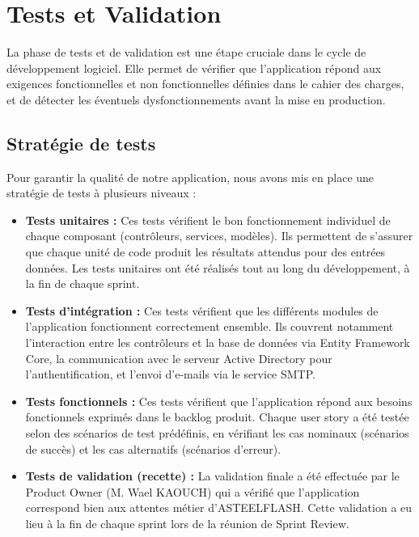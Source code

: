 \section{Tests et Validation}

La phase de tests et de validation est une étape cruciale dans le cycle de développement logiciel. Elle permet de vérifier que l'application répond aux exigences fonctionnelles et non fonctionnelles définies dans le cahier des charges, et de détecter les éventuels dysfonctionnements avant la mise en production.

\subsection{Stratégie de tests}

Pour garantir la qualité de notre application, nous avons mis en place une stratégie de tests à plusieurs niveaux :

\begin{itemize}[label=\textbullet,font=\normalsize]
    \item \textbf{Tests unitaires :} Ces tests vérifient le bon fonctionnement individuel de chaque composant (contrôleurs, services, modèles). Ils permettent de s'assurer que chaque unité de code produit les résultats attendus pour des entrées données. Les tests unitaires ont été réalisés tout au long du développement, à la fin de chaque sprint.
    
    \item \textbf{Tests d'intégration :} Ces tests vérifient que les différents modules de l'application fonctionnent correctement ensemble. Ils couvrent notamment l'interaction entre les contrôleurs et la base de données via Entity Framework Core, la communication avec le serveur Active Directory pour l'authentification, et l'envoi d'e-mails via le service SMTP.
    
    \item \textbf{Tests fonctionnels :} Ces tests vérifient que l'application répond aux besoins fonctionnels exprimés dans le backlog produit. Chaque user story a été testée selon des scénarios de test prédéfinis, en vérifiant les cas nominaux (scénarios de succès) et les cas alternatifs (scénarios d'erreur).
    
    \item \textbf{Tests de validation (recette) :} La validation finale a été effectuée par le Product Owner (M. Wael KAOUCH) qui a vérifié que l'application correspond bien aux attentes métier d'ASTEELFLASH. Cette validation a eu lieu à la fin de chaque sprint lors de la réunion de Sprint Review.
\end{itemize}

